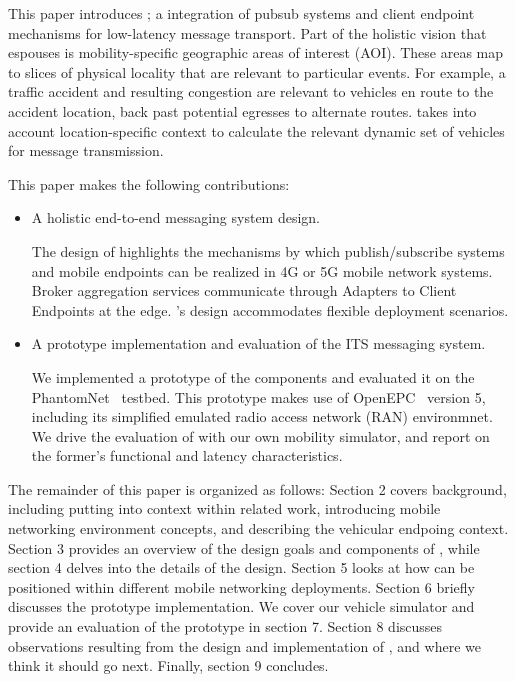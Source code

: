 This paper introduces \name; a integration of pubsub systems and
client endpoint mechanisms for low-latency message transport.  Part of
the holistic vision that \name{} espouses is mobility-specific
geographic areas of interest (AOI). These areas map to slices of
physical locality that are relevant to particular events.  For
example, a traffic accident and resulting congestion are relevant to
vehicles en route to the accident location, back past potential
egresses to alternate routes.  \name{} takes into account
location-specific context to calculate the relevant dynamic set of
vehicles for message transmission.

This paper makes the following contributions:
\begin{itemize}

\item A holistic end-to-end messaging system design.

The design of \name{} highlights the mechanisms by which
publish/subscribe systems and mobile endpoints can be realized in 4G
or 5G mobile network systems. Broker aggregation services communicate
through Adapters to Client Endpoints at the edge. \name's design
accommodates flexible deployment scenarios.

\item A prototype implementation and evaluation of the \name{} ITS
  messaging system.

We implemented a prototype of the \name{} components and evaluated it
on the PhantomNet~\cite{banerjee2015phantomnet} testbed.  This
prototype makes use of OpenEPC~\cite{corici2010openepc} version 5,
including its simplified emulated radio access network (RAN)
environmnet. We drive the evaluation of \name{} with our own mobility
simulator, and report on the former's functional and latency
characteristics.

\end{itemize}

The remainder of this paper is organized as follows: Section 2 covers
background, including putting \name{} into context within related
work, introducing mobile networking environment concepts, and
describing the vehicular endpoing context. Section 3 provides an
overview of the design goals and components of \name, while section
4 delves into the details of the design. Section 5 looks at how
\name{} can be positioned within different mobile networking
deployments.  Section 6 briefly discusses the \name{} prototype
implementation. We cover our vehicle simulator and provide an
evaluation of the prototype in section 7. Section 8 discusses
observations resulting from the design and implementation of \name,
and where we think it should go next.  Finally, section 9 concludes.
